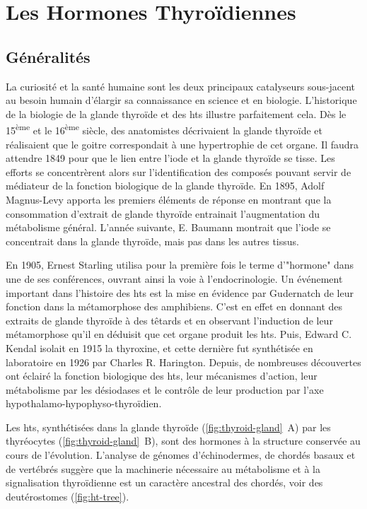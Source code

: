 \chapter{Les Hormones Thyroïdiennes}


\section{Généralités}

La curiosité et la santé humaine sont les deux principaux catalyseurs sous-jacent au besoin humain d'élargir sa connaissance en science et en biologie.
L'historique de la biologie de la glande thyroïde et des \glspl{ht} illustre parfaitement cela.
Dès le 15\textsuperscript{ème} et le 16\textsuperscript{ème} siècle, des anatomistes décrivaient la glande thyroïde et réalisaient que le goitre correspondait à une hypertrophie de cet organe.
Il faudra attendre 1849 pour que le lien entre l'iode et la glande thyroïde se tisse.
Les efforts se concentrèrent alors sur l'identification des composés pouvant servir de médiateur de la fonction biologique de la glande thyroïde.
En 1895, Adolf Magnus-Levy apporta les premiers éléments de réponse en montrant que la consommation d'extrait de glande thyroïde entrainait l'augmentation du métabolisme général.
L'année suivante, E. Baumann montrait que l'iode se concentrait dans la glande thyroïde, mais pas dans les autres tissus.



En 1905, Ernest Starling utilisa pour la première fois le terme d'"hormone" dans une de ses conférences, ouvrant ainsi la voie à l'endocrinologie.
Un événement important dans l'histoire des \glspl{ht} est la mise en évidence par Gudernatch de leur fonction dans la métamorphose des amphibiens.
C'est en effet en donnant des extraits de glande thyroïde à des têtards et en observant l'induction de leur métamorphose qu'il en déduisit que cet organe produit les \glspl{ht}.
Puis, Edward C. Kendal isolait en 1915 la thyroxine, et cette dernière fut synthétisée en laboratoire en 1926 par Charles R. Harington.
Depuis, de nombreuses découvertes ont éclairé la fonction biologique des \glspl{ht}, leur mécanismes d'action, leur métabolisme par les désiodases et le contrôle de leur production par l'axe hypothalamo-hypophyso-thyroïdien.

Les \glspl{ht}, synthétisées dans la glande thyroïde (\autoref{fig:thyroid-gland}~A) par les thyréocytes (\autoref{fig:thyroid-gland}~B), sont des hormones à la structure conservée au cours de l'évolution.
L'analyse de génomes d'échinodermes, de chordés basaux et de vertébrés suggère que la machinerie nécessaire au métabolisme et à la signalisation thyroïdienne est un caractère ancestral des chordés, voir des deutérostomes \citep{Paris2008} (\autoref{fig:ht-tree}).

